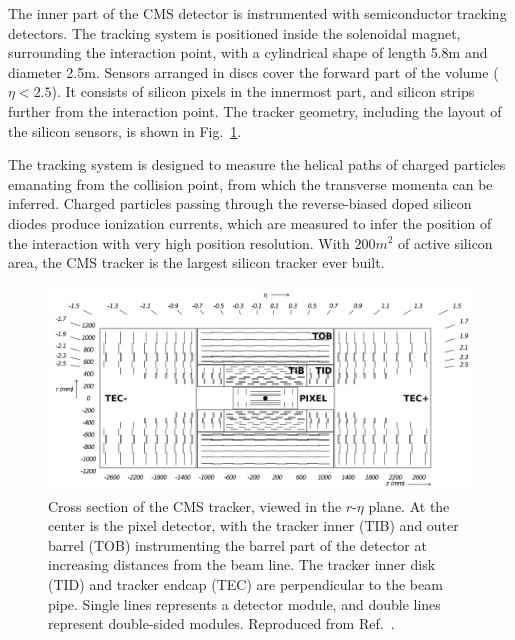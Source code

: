 The inner part of the CMS detector is instrumented with semiconductor tracking detectors.
The tracking system is positioned inside the solenoidal magnet, surrounding the interaction point,
with a cylindrical shape of length 5.8\unit{m} and diameter 2.5\unit{m}. 
Sensors arranged in discs cover the forward part of the volume ($\eta < 2.5$).
It consists of silicon pixels in the innermost part, and silicon strips further from
the interaction point. The tracker geometry, including the layout of the silicon 
sensors, is shown in Fig.~\ref{fig:trackerCrossSec}.

The tracking system is designed to measure the helical paths of charged
particles emanating from the collision point, from which the transverse
momenta can be inferred. Charged particles passing through
the reverse-biased doped silicon diodes produce ionization currents, which are measured
to infer the position of the interaction with very high position resolution. 
With $200\unit{m}^2$ of active silicon area, the CMS tracker is the largest
silicon tracker ever built.

\begin{figure}[htbp]
  \centering
   \includegraphics[width=\textwidth]{figures/LHCandCMS/trackerCrossSection.png}
  \caption[Cross section of the CMS tracker, viewed in the $r$-$\eta$ plane]
  {
    Cross section of the CMS tracker, viewed in the $r$-$\eta$ plane.
    At the center is the pixel detector, with the tracker inner (TIB) and
    outer barrel (TOB) instrumenting the barrel part of the detector
    at increasing distances from the beam line. The tracker inner disk (TID)
    and tracker endcap (TEC) are perpendicular to the beam pipe.
    Single lines represents a detector module, and double lines represent
    double-sided modules. Reproduced from Ref.~\cite{Chatrchyan:2009aa}.
        }
 \label{fig:trackerCrossSec}
\end{figure}


